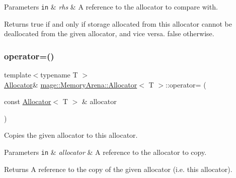 \begin{DoxyParams}[1]{Parameters}
\mbox{\tt in}  & {\em rhs} & A reference to the allocator to compare with. \\
\hline
\end{DoxyParams}
\begin{DoxyReturn}{Returns}
{\ttfamily true} if and only if storage allocated from this allocator cannot be deallocated from the given allocator, and vice versa. {\ttfamily false} otherwise. 
\end{DoxyReturn}
\mbox{\label{classmage_1_1_memory_arena_1_1_allocator_aca3a631f0323c15f27dfc7ce42763be0}} 
\subsubsection{\texorpdfstring{operator=()}{operator=()}\hspace{0.1cm}{\footnotesize\ttfamily [1/2]}}
{\footnotesize\ttfamily template$<$typename T $>$ \\
\mbox{\hyperlink{classmage_1_1_memory_arena_1_1_allocator}{Allocator}}\& \mbox{\hyperlink{classmage_1_1_memory_arena_1_1_allocator}{mage\+::\+Memory\+Arena\+::\+Allocator}}$<$ T $>$\+::operator= (\begin{DoxyParamCaption}\item[{const \mbox{\hyperlink{classmage_1_1_memory_arena_1_1_allocator}{Allocator}}$<$ T $>$ \&}]{allocator }\end{DoxyParamCaption})\hspace{0.3cm}{\ttfamily [delete]}}

Copies the given allocator to this allocator.


\begin{DoxyParams}[1]{Parameters}
\mbox{\tt in}  & {\em allocator} & A reference to the allocator to copy. \\
\hline
\end{DoxyParams}
\begin{DoxyReturn}{Returns}
A reference to the copy of the given allocator (i.\+e. this allocator). 
\end{DoxyReturn}
\mbox{\label{classmage_1_1_memory_arena_1_1_allocator_a4d9c913c8eff35781d507875f6f83934}} 
